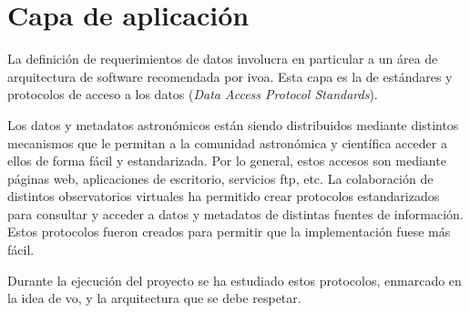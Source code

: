 \chapter{Capa de aplicación}

La definición de requerimientos de datos involucra en particular a un área de arquitectura de software recomendada por \gls{ivoa}. Esta capa es la de estándares y protocolos de acceso a los datos (\emph{Data Access Protocol Standards}).

Los datos y metadatos astronómicos están siendo distribuidos mediante distintos mecanismos que le permitan a la comunidad astronómica y científica acceder a ellos de forma fácil y estandarizada. Por lo general, estos accesos son mediante páginas web, aplicaciones de escritorio, servicios \gls{ftp}, etc. La colaboración de distintos observatorios virtuales ha permitido crear protocolos estandarizados para consultar y acceder a datos y metadatos de distintas fuentes de información. Estos protocolos fueron creados para permitir que la implementación fuese más fácil.

Durante la ejecución del proyecto se ha estudiado estos protocolos, enmarcado en la idea de \gls{vo}, y la arquitectura que se debe respetar.

